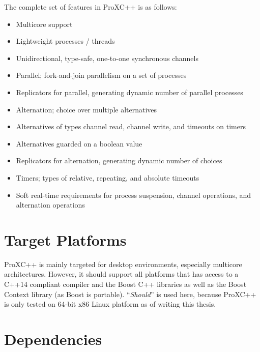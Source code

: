 The complete set of features in ProXC++ is as follows:

\begin{itemize}[topsep=0em,itemsep=-1em,partopsep=0.5em,parsep=1em]
    \item Multicore support
    \item Lightweight processes / threads
    \item Unidirectional, type\hyp{}safe, one\hyp{}to\hyp{}one synchronous channels
    \item Parallel; fork\hyp{}and\hyp{}join parallelism on a set of processes
    \item Replicators for parallel, generating dynamic number of parallel processes
    \item Alternation; choice over multiple alternatives
    \item Alternatives of types channel read, channel write, and timeouts on timers
    \item Alternatives guarded on a boolean value
    \item Replicators for alternation, generating dynamic number of choices
    \item Timers; types of relative, repeating, and absolute timeouts
    \item Soft real\hyp{}time requirements for process suspension, channel operations, and alternation operations
\end{itemize}


\section{Target Platforms}
\label{sec:target_platforms}

ProXC++ is mainly targeted for desktop environments, especially multicore architectures. However, it should support all platforms that has access to a C++14 compliant compiler and the Boost C++ libraries \citep{boost2017boost} as well as the Boost Context library \citep{kowalke2017boost} (as Boost is portable). ``\textit{Should}'' is used here, because ProXC++ is only tested on 64\hyp{}bit x86 Linux platform as of writing this thesis.


\section{Dependencies}
\label{sec:dependencies}

